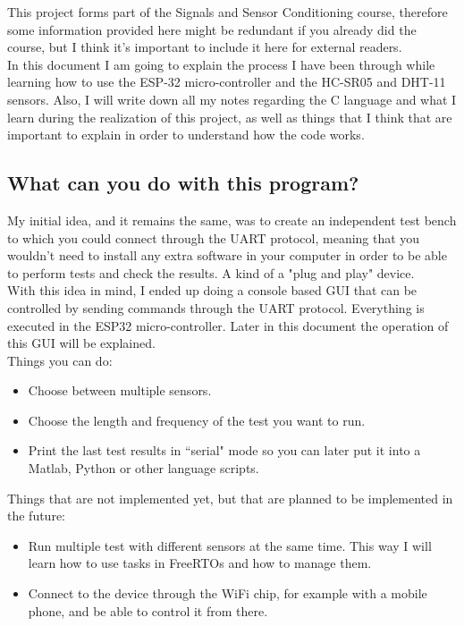 \documentclass[14pt]{article}
\begin{document}
	\begin{normalsize}
		
		This project forms part of the Signals and Sensor Conditioning course, therefore some information provided here might be redundant if you already did the course, but I think it's important to include it here for external readers.\\
		
		In this document I am going to explain the process I have been through while learning how to use the ESP-32 micro-controller and the HC-SR05 and DHT-11 sensors. Also, I will write down all my notes regarding the C language and what I learn during the realization of this project, as well as things that I think that are important to explain in order to understand how the code works.
		\subsection{What can you do with this program?}
		My initial idea, and it remains the same, was to create an independent test bench to which you could connect through the UART protocol, meaning that you wouldn't need to install any extra software in your computer in order to be able to perform tests and check the results. A kind of a "plug and play" device.\\
		
		With this idea in mind, I ended up doing a console based GUI that can be controlled by sending commands through the UART protocol. Everything is executed in the ESP32 micro-controller. Later in this document the operation of this GUI will be explained.\\
		
		Things you can do:
		\begin{itemize}
			\item Choose between multiple sensors.
			\item Choose the length and frequency of the test you want to run.
			\item Print the last test results in ``serial" mode so you can later put it into a Matlab, Python or other language scripts.
		\end{itemize}
		Things that are not implemented yet, but that are planned to be implemented in the future:
		\begin{itemize}
			 \item Run multiple test with different sensors at the same time. This way I will learn how to use tasks in FreeRTOs and how to manage them.
			 \item Connect to the device through the WiFi chip, for example with a mobile phone, and be able to control it from there.
		\end{itemize}

\end{normalsize}
\end{document}
